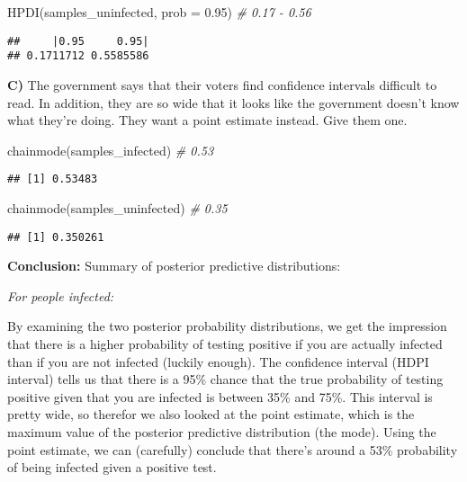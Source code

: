 \documentclass[
]{article}
\newenvironment{Shaded}{\begin{snugshade}}{\end{snugshade}}
\newcommand{\AttributeTok}[1]{\textcolor[rgb]{0.77,0.63,0.00}{#1}}
\newcommand{\CommentTok}[1]{\textcolor[rgb]{0.56,0.35,0.01}{\textit{#1}}}
\newcommand{\FloatTok}[1]{\textcolor[rgb]{0.00,0.00,0.81}{#1}}
\newcommand{\FunctionTok}[1]{\textcolor[rgb]{0.00,0.00,0.00}{#1}}
\newcommand{\NormalTok}[1]{#1}
\begin{document}
\begin{Shaded}
\begin{Highlighting}[]
\FunctionTok{HPDI}\NormalTok{(samples\_uninfected, }\AttributeTok{prob =} \FloatTok{0.95}\NormalTok{) }\CommentTok{\# 0.17 {-} 0.56}
\end{Highlighting}
\end{Shaded}

\begin{verbatim}
##     |0.95     0.95| 
## 0.1711712 0.5585586
\end{verbatim}

\textbf{C)} The government says that their voters find confidence
intervals difficult to read. In addition, they are so wide that it looks
like the government doesn't know what they're doing. They want a point
estimate instead. Give them one.

\begin{Shaded}
\begin{Highlighting}[]
\FunctionTok{chainmode}\NormalTok{(samples\_infected) }\CommentTok{\# 0.53}
\end{Highlighting}
\end{Shaded}

\begin{verbatim}
## [1] 0.53483
\end{verbatim}

\begin{Shaded}
\begin{Highlighting}[]
\FunctionTok{chainmode}\NormalTok{(samples\_uninfected) }\CommentTok{\# 0.35}
\end{Highlighting}
\end{Shaded}

\begin{verbatim}
## [1] 0.350261
\end{verbatim}

\textbf{Conclusion:} Summary of posterior predictive distributions:

\emph{For people infected:}

By examining the two posterior probability distributions, we get the
impression that there is a higher probability of testing positive if you
are actually infected than if you are not infected (luckily enough). The
confidence interval (HDPI interval) tells us that there is a 95\% chance
that the true probability of testing positive given that you are
infected is between 35\% and 75\%. This interval is pretty wide, so
therefor we also looked at the point estimate, which is the maximum
value of the posterior predictive distribution (the mode). Using the
point estimate, we can (carefully) conclude that there's around a 53\%
probability of being infected given a positive test.
\end{document}
